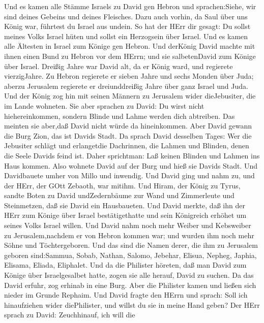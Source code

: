  Und es kamen alle Stämme Israels zu David gen Hebron und
sprachen:Siehe, wir sind deines Gebeins und deines Fleisches.
 Dazu auch vorhin, da Saul über uns König war, führtest du
Israel aus undein. So hat der HErr dir gesagt: Du sollst meines Volks
Israel hüten und sollst ein Herzogsein über Israel.  Und es
kamen alle Ältesten in Israel zum Könige gen Hebron. Und derKönig David
machte mit ihnen einen Bund zu Hebron vor dem HErrn; und sie
salbetenDavid zum Könige über Israel.  Dreißig Jahre war
David alt, da er König ward, und regierete vierzigJahre.  Zu
Hebron regierete er sieben Jahre und sechs Monden über Juda; aberzu
Jerusalem regierete er dreiunddreißig Jahre über ganz Israel und Juda.
 Und der König zog hin mit seinen Männern zu Jerusalem wider
dieJebusiter, die im Lande wohneten. Sie aber sprachen zu David: Du
wirst nicht hiehereinkommen, sondern Blinde und Lahme werden dich
abtreiben. Das meinten sie aber,daß David nicht würde da hineinkommen.
 Aber David gewann die Burg Zion, das ist Davids Stadt.
 Da sprach David desselben Tages: Wer die Jebusiter schlägt
und erlangetdie Dachrinnen, die Lahmen und Blinden, denen die Seele
Davids feind ist. Daher sprichtman: Laß keinen Blinden und Lahmen ins
Haus kommen.  Also wohnete David auf der Burg und hieß sie
Davids Stadt. Und Davidbauete umher von Millo und inwendig.
 Und David ging und nahm zu, und der HErr, der GOtt
Zebaoth, war mitihm.  Und Hiram, der König zu Tyrus, sandte
Boten zu David undZedernbäume zur Wand und Zimmerleute und Steinmetzen,
daß sie David ein Hausbaueten.  Und David merkte, daß ihn
der HErr zum Könige über Israel bestätigethatte und sein Königreich
erhöhet um seines Volks Israel willen.  Und David nahm noch
mehr Weiber und Kebsweiber zu Jerusalem,nachdem er von Hebron kommen
war; und wurden ihm noch mehr Söhne und Töchtergeboren. 
Und das sind die Namen derer, die ihm zu Jerusalem geboren sind:Sammua,
Sobab, Nathan, Salomo,  Jebehar, Elisua, Nepheg, Japhia,
 Elisama, Eliada, Eliphalet.  Und da die
Philister höreten, daß man David zum Könige über Israelgesalbet hatte,
zogen sie alle herauf, David zu suchen. Da das David erfuhr, zog erhinab
in eine Burg.  Aber die Philister kamen und ließen sich
nieder im Grunde Rephaim.  Und David fragte den HErrn und
sprach: Soll ich hinaufziehen wider diePhilister, und willst du sie in
meine Hand geben? Der HErr sprach zu David: Zeuchhinauf, ich will die
